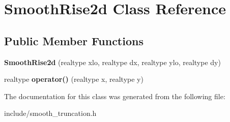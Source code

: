 \hypertarget{classSmoothRise2d}{\section{Smooth\+Rise2d Class Reference}
\label{classSmoothRise2d}
}
\subsection*{Public Member Functions}
\begin{DoxyCompactItemize}
\item 
\hypertarget{classSmoothRise2d_a50cf46c78bc33d5ed848840b824a2017}{{\bfseries Smooth\+Rise2d} (realtype xlo, realtype dx, realtype ylo, realtype dy)}\label{classSmoothRise2d_a50cf46c78bc33d5ed848840b824a2017}

\item 
\hypertarget{classSmoothRise2d_ab75a6c6e114e616487d6c05551a40a62}{realtype {\bfseries operator()} (realtype x, realtype y)}\label{classSmoothRise2d_ab75a6c6e114e616487d6c05551a40a62}

\end{DoxyCompactItemize}


The documentation for this class was generated from the following file\+:\begin{DoxyCompactItemize}
\item 
include/smooth\+\_\+truncation.\+h\end{DoxyCompactItemize}
